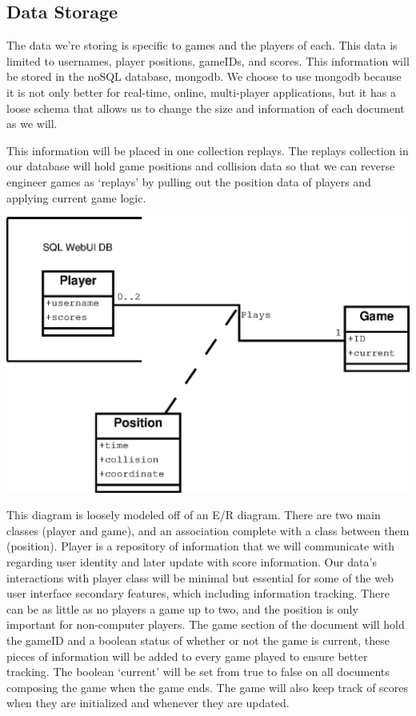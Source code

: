 \documentclass[letterpaper,12pt]{article}
\begin{document}
\subsection{Data Storage}
The data we’re storing is specific to games and the players of each. This data is limited to usernames, player positions, gameIDs, and scores. This information will be stored in the noSQL database, mongodb. We choose to use mongodb because it is not only better for real-time, online, multi-player applications, but it has a loose schema that allows us to change the size and information of each document as we will.

This information will be placed in one collection replays. The replays collection in our database will hold game positions and collision data so that we can reverse engineer games as ‘replays’ by pulling out the position data of players and applying current game logic.

\includegraphics{ERdia.eps}


This diagram is loosely modeled off of an E/R diagram. There are two main classes (player and game), and an association complete with a class between them (position). Player is a repository of information that we will communicate with regarding user identity and later update with score information. Our data’s interactions with player class will be minimal but essential for some of the web user interface secondary features, which including information tracking. There can be as little as no players a game up to two, and the position is only important for non-computer players. The game section of the document will hold the gameID and a boolean status of whether or not the game is current, these pieces of information will be added to every game played to ensure better tracking. The boolean ‘current’ will be set from true to false on all documents composing the game when the game ends. The game will also keep track of scores when they are initialized and whenever they are updated.
\end{document}
